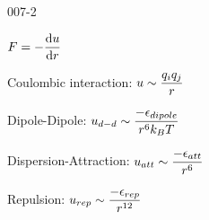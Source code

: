 \begin{mitframe}{007-2} %

    
    
    \begin{listone}
    
      \item $\force = -\dfrac{\mathrm{d}\forcepot}{\mathrm{d}\pos}$
      

      \item Coulombic interaction: $\forcepot \sim \dfrac{\charge{i} \charge{j}}{\pos}$

      \item Dipole-Dipole: $\forcepot_{d-d} \sim \dfrac{-\dielec_{dipole}}{\pos^6\boltz\Temp}$
      
      

      \item Dispersion-Attraction: $\forcepot_{att} \sim \dfrac{-\dielec_{att}}{\pos^6}$

      \item Repulsion: $\forcepot_{rep} \sim \dfrac{-\dielec_{rep}}{\pos^{12}}$
      
    
    \end{listone}
 
\end{mitframe}